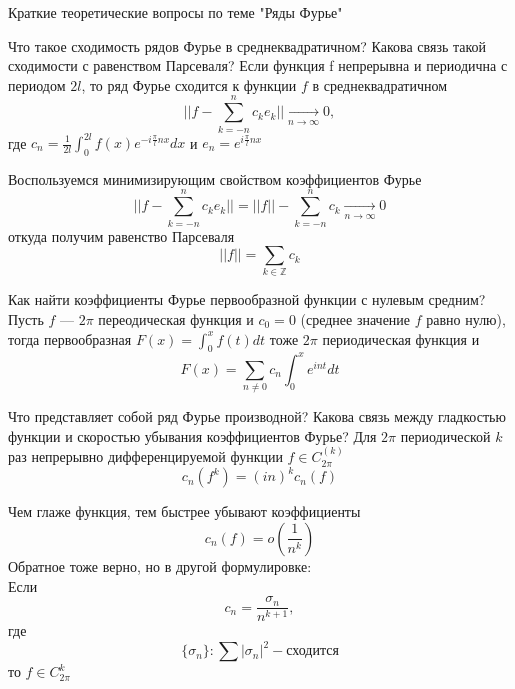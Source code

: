 \documentclass{article}
\begin{document}
\begin{section}{Краткие теоретические вопросы по теме "Ряды Фурье"}
\begin{subsection}{Что такое сходимость рядов Фурье в среднеквадратичном? Какова связь такой сходимости с равенством Парсеваля?}
Если функция f непрерывна и периодична с периодом $ 2l $, то ряд Фурье сходится к функции $ f $ в среднеквадратичном
\[ ||f-\sum_{k=-n}^{n} c_k e_k|| \underset{n \rightarrow \infty}{\longrightarrow} 0 ,\] 
где $c_n = \frac{1}{2l}\int_0^{2l}f(x)e^{-i\frac{\pi}{l}nx}dx$ и $e_n = e^{i\frac{\pi}{l}nx}$

Воспользуемся минимизирующим свойством коэффициентов Фурье 
\[ ||f-\sum_{k=-n}^{n} c_k e_k|| = 
||f|| - \sum_{k=-n}^{n}c_k \underset{n \rightarrow \infty}{\longrightarrow} 0\]
откуда получим равенство Парсеваля
\[ ||f|| = \sum_{k \in \mathbb{Z}} c_k \]
\end{subsection}


\begin{subsection}{Как найти коэффициенты Фурье первообразной функции с нулевым средним?}
Пусть $ f $ ---  $ 2\pi $ переодическая функция и $ c_0 = 0 $ (среднее значение $f$ равно нулю), тогда первообразная $ F(x) = \int_{0}^{x}f(t)dt $ тоже $ 2\pi $ периодическая функция и 
\[ F(x) = \sum_{n \neq 0}c_n \int_{0}^{x} e^{int}dt \]
\end{subsection}


\begin{subsection}{Что представляет собой ряд Фурье производной? Какова связь между гладкостью функции и скоростью убывания коэффициентов Фурье?}
Для $ 2\pi $ периодической $ k $ раз непрерывно дифференцируемой функции $ f \in C_{2\pi}^{(k)} $
\[ c_n(f^{k}) = (in)^k c_n(f)  \]

Чем глаже функция, тем быстрее убывают коэффициенты 
\[ c_n(f) = o\left(\frac{1}{n^k}\right)\]
Обратное тоже верно, но в другой формулировке:\\
Если
\[ c_n = \frac{\sigma_n}{n^{k+1}}, \]
где \[ \{\sigma_n\}: \sum |\sigma_n|^2 - \text{сходится}  \]
то $f \in C_{2\pi}^k$
\end{subsection}

\end{section}

\end{document}
